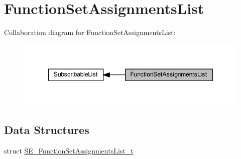 \hypertarget{group__FunctionSetAssignmentsList}{}\section{Function\+Set\+Assignments\+List}
\label{group__FunctionSetAssignmentsList}
Collaboration diagram for Function\+Set\+Assignments\+List\+:\nopagebreak
\begin{figure}[H]
\begin{center}
\leavevmode
\includegraphics[width=347pt]{group__FunctionSetAssignmentsList}
\end{center}
\end{figure}
\subsection*{Data Structures}
\begin{DoxyCompactItemize}
\item 
struct \hyperlink{structSE__FunctionSetAssignmentsList__t}{S\+E\+\_\+\+Function\+Set\+Assignments\+List\+\_\+t}
\end{DoxyCompactItemize}
